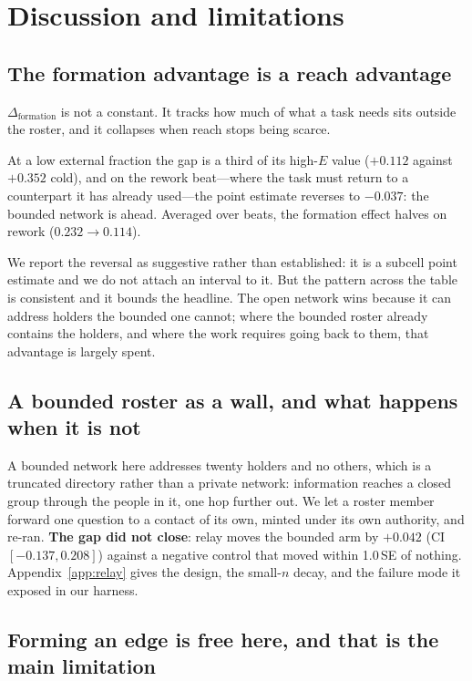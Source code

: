 \section{Discussion and limitations}

\subsection{The formation advantage is a reach advantage}

$\Delta_\text{formation}$ is not a constant. It tracks how much of what a task needs
sits outside the roster, and it collapses when reach stops being scarce.

At a low external fraction the gap is a third of its high-$E$ value ($+0.112$ against
$+0.352$ cold), and on the rework beat---where the task must return to a counterpart it
has already used---the point estimate reverses to $-0.037$: the bounded network is ahead.
Averaged over beats, the formation effect halves on rework ($0.232 \to 0.114$).

We report the reversal as suggestive rather than established: it is a subcell point
estimate and we do not attach an interval to it. But the pattern across the table is
consistent and it bounds the headline. The open network wins because it can address
holders the bounded one cannot; where the bounded roster already contains the holders,
and where the work requires going back to them, that advantage is largely spent.

\subsection{A bounded roster as a wall, and what happens when it is not}

A bounded network here addresses twenty holders and no others, which is a truncated
directory rather than a private network: information reaches a closed group through the
people in it, one hop further out. We let a roster member forward one question to a
contact of its own, minted under its own authority, and re-ran. \textbf{The gap did not
close}: relay moves the bounded arm by $+0.042$ (CI $[-0.137, 0.208]$) against a negative
control that moved within 1.0\,SE of nothing. Appendix~\ref{app:relay} gives the design,
the small-$n$ decay, and the failure mode it exposed in our harness.

\subsection{Forming an edge is free here, and that is the main limitation}

